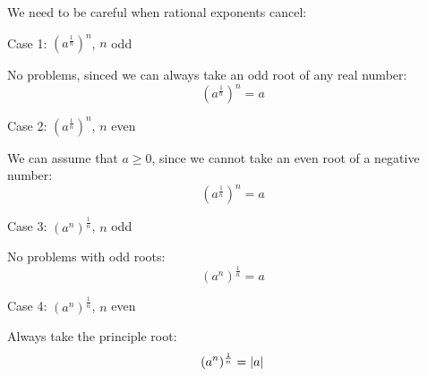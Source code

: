 \documentclass[letterpaper,12pt,fleqn]{article}
\begin{document}
We need to be careful when rational exponents cancel:

\begin{description}
\item Case 1: $(a^{\frac{1}{n}})^n$, $n$ odd

  No problems, sinced we can always take an odd root of any real number:
  \[(a^{\frac{1}{n}})^n=a\]

\item Case 2: $(a^{\frac{1}{n}})^n$, $n$ even

  We can assume that $a\ge0$, since we cannot take an even root of a negative
  number:
  \[(a^{\frac{1}{n}})^n=a\]

\item Case 3: $(a^n)^{\frac{1}{n}}$, $n$ odd

  No problems with odd roots:
  \[(a^n)^{\frac{1}{n}}=a\]

\item Case 4: $(a^n)^{\frac{1}{n}}$, $n$ even

  Always take the principle root:
  \[(a^n)^{\frac{1}{n}}=\lvert a\rvert\]
\end{description}
\end{document}
